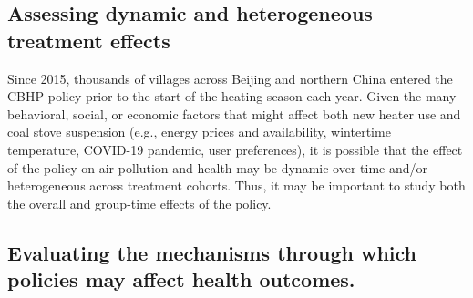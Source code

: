 \documentclass[
  letterpaper,
  DIV=11,
  numbers=noendperiod]{scrartcl}
\begin{document}
\hypertarget{assessing-dynamic-and-heterogeneous-treatment-effects}{%
\subsection{Assessing dynamic and heterogeneous treatment
effects}\label{assessing-dynamic-and-heterogeneous-treatment-effects}}

Since 2015, thousands of villages across Beijing and northern China
entered the CBHP policy prior to the start of the heating season each
year. Given the many behavioral, social, or economic factors that might
affect both new heater use and coal stove suspension (e.g., energy
prices and availability, wintertime temperature, COVID-19 pandemic, user
preferences), it is possible that the effect of the policy on air
pollution and health may be dynamic over time and/or heterogeneous
across treatment cohorts. Thus, it may be important to study both the
overall and group-time effects of the policy.

\hypertarget{evaluating-the-mechanisms-through-which-policies-may-affect-health-outcomes.}{%
\subsection{Evaluating the mechanisms through which policies may affect
health
outcomes.}\label{evaluating-the-mechanisms-through-which-policies-may-affect-health-outcomes.}}
\end{document}
